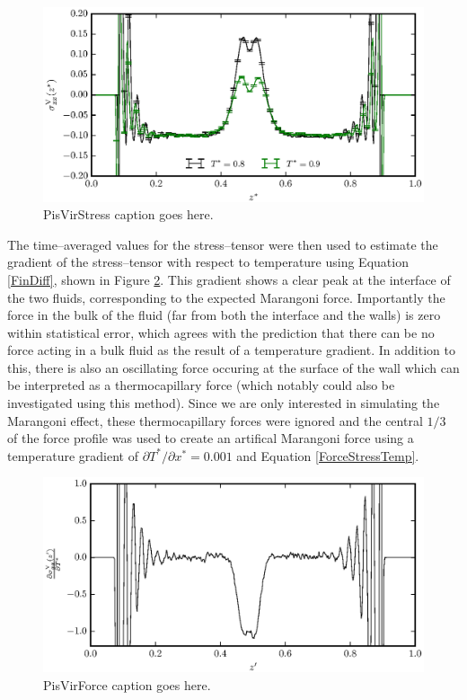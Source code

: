 \begin{figure}[h]
\centering
\includegraphics[scale=0.8]{PisVirStress}
\caption{PisVirStress caption goes here.}
\label{PisVirStress}
\end{figure}

\FloatBarrier
The time--averaged values for the stress--tensor were then used to estimate the gradient of the stress--tensor with respect to temperature using Equation \ref{FinDiff}, shown in Figure \ref{PisVirForce}.
This gradient shows a clear peak at the interface of the two fluids, corresponding to the expected Marangoni force.
Importantly the force in the bulk of the fluid (far from both the interface and the walls) is zero within statistical error, which agrees with the prediction that there can be no force acting in a bulk fluid as the result of a temperature gradient.
In addition to this, there is also an oscillating force occuring at the surface of the wall which can be interpreted as a thermocapillary force (which notably could also be investigated using this method).
Since we are only interested in simulating the Marangoni effect, these thermocapillary forces were ignored and the central $1/3$ of the force profile was used to create an artifical Marangoni force using a temperature gradient of $\partial T^{*} / \partial x^{*} = 0.001$ and Equation \ref{ForceStressTemp}.

\begin{figure}[h]
\centering
\includegraphics[scale=0.8]{PisVirForce}
\caption{PisVirForce caption goes here.}
\label{PisVirForce}
\end{figure}
\FloatBarrier

